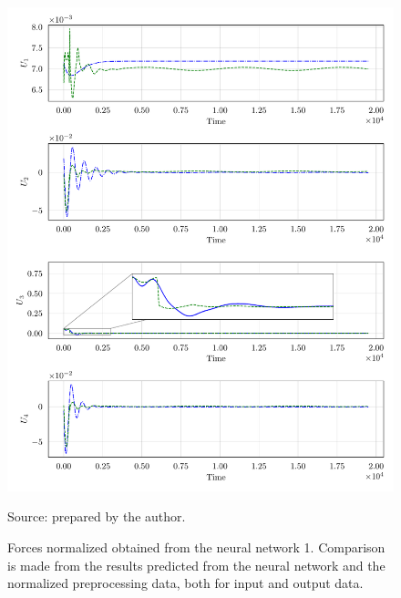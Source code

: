 \begin{figure}[!htb]
    \centering
    \caption[Forces normalized obtained from the neural network 1]{Forces normalized obtained from the neural network 1. Comparison is made from the results predicted from the neural network and the normalized preprocessing data, both for input and output data.}
    \includegraphics{figures/4results/uav/forces_normalized.pdf}

    {\footnotesize Source: prepared by the author.}
    \label{fig:forces_normalized}
\end{figure}

